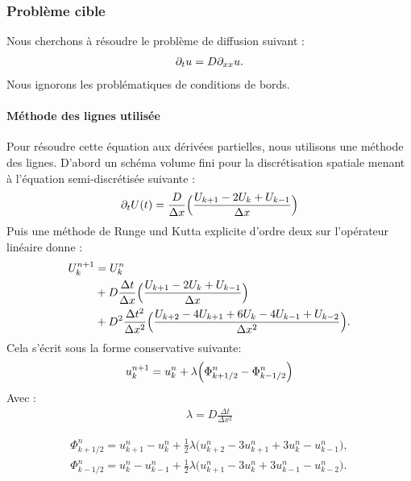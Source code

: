 \subsubsection{Problème cible}
    Nous cherchons à résoudre le problème de diffusion suivant :
    \begin{align}
        \partial_t u = D \partial_{xx} u.
    \end{align}
    Nous ignorons les problématiques de conditions de bords.
        \paragraph{Méthode des lignes utilisée}
            Pour résoudre cette équation aux dérivées partielles, nous utilisons une méthode des lignes. 
            D'abord un schéma volume fini pour la discrétisation spatiale menant à l'équation semi-discrétisée suivante : 
            \begin{align}
                \partial_t U(t) = \frac{D}{\Delta x} \Bigl(\frac{U_{k+1} - 2 U_{k} + U_{k-1}}{\Delta x}\Bigr)
            \end{align}
            Puis une méthode de Runge und Kutta explicite d'ordre deux sur l’opérateur linéaire donne :
            \begin{align}
                U_k^{n+1} &= U_k^n\\ \notag
                &+ D \frac{\Delta t}{\Delta x} \Bigl(\frac{U_{k+1} - 2 U_{k} + U_{k-1}}{\Delta x}\Bigr)\\ \notag
                &+ D^2 \frac{\Delta t^2}{\Delta x^2} \Bigl(\frac{U_{k+2} -4 U_{k+1}  +6 U_{k} -4 U_{k-1} + U_{k-2}}{\Delta x^2}\Bigr).
            \end{align}
            Cela s'écrit sous la forme conservative suivante:
            \begin{align}
                u^{n+1}_k = u^n_k + \lambda \Bigl( \Phi^n_{k+1/2} - \Phi^n_{k-1/2} \Bigr)
            \end{align}
            Avec : 
            \begin{align}
                \lambda = D \frac{\Delta t}{\Delta x^2}
            \end{align}

            \begin{align}
                \Phi^n_{k+1/2} = u^n_{k+1} - u^n_{k} + \frac{1}{2} \lambda \bigl( u^n_{k+2} - 3  u^n_{k+1} + 3 u^n_{k} - u^n_{k-1} \bigr),\\
                \Phi^n_{k-1/2} = u^n_{k} - u^n_{k-1} + \frac{1}{2} \lambda \bigl( u^n_{k+1} - 3  u^n_{k} + 3 u^n_{k-1} - u^n_{k-2} \bigr).  
            \end{align}

